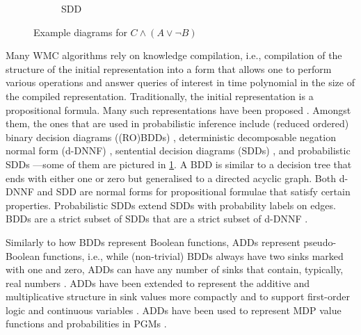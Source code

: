 \begin{figure}
\begin{subfigure}{0.30\textwidth}
    \caption{SDD}
  \end{subfigure}
  \caption{Example diagrams for $C \land (A \lor \neg B)$}
  \label{fig:kc}
\end{figure}

Many WMC algorithms rely on knowledge compilation, i.e., compilation of the
structure of the initial representation into a form that allows one to perform
various operations and answer queries of interest in time polynomial in the size
of the compiled representation. Traditionally, the initial representation is a
propositional formula. Many such representations have been proposed
\citep{DBLP:journals/jair/DarwicheM02}. Amongst them, the ones that are used in
probabilistic inference include (reduced ordered) binary decision diagrams
((RO)BDDs) \citep{DBLP:journals/tc/Bryant86}, deterministic decomposable negation
normal form (d-DNNF) \citep{DBLP:journals/jancl/Darwiche01}, sentential decision
diagrams (SDDs) \citep{DBLP:conf/ijcai/Darwiche11}, and probabilistic SDDs
\citep{DBLP:conf/kr/KisaBCD14}---some of them are pictured in \cref{fig:kc}. A
BDD is similar to a decision tree that ends with either one or zero but
generalised to a directed acyclic graph. Both d-DNNF and SDD are normal forms
for propositional formulae that satisfy certain properties. Probabilistic SDDs
extend SDDs with probability labels on edges. BDDs are a strict subset of SDDs
that are a strict subset of d-DNNF \citep{DBLP:conf/ijcai/Darwiche11}.

Similarly to how BDDs represent Boolean functions, ADDs represent pseudo-Boolean
functions, i.e., while (non-trivial) BDDs always have two sinks marked with one
and zero, ADDs can have any number of sinks that contain, typically, real
numbers \citep{DBLP:journals/fmsd/BaharFGHMPS97}. ADDs have been extended to
represent the additive and multiplicative structure in sink values more
compactly \citep{DBLP:conf/ijcai/SannerM05} and to support first-order logic
\citep{DBLP:journals/ai/SannerB09} and continuous variables
\citep{DBLP:conf/uai/SannerDB11}. ADDs have been used to represent MDP value
functions \citep{DBLP:conf/uai/HoeySHB99} and probabilities in PGMs
\citep{DBLP:conf/ijcai/ChaviraD07,DBLP:conf/uai/GogateD11}.

